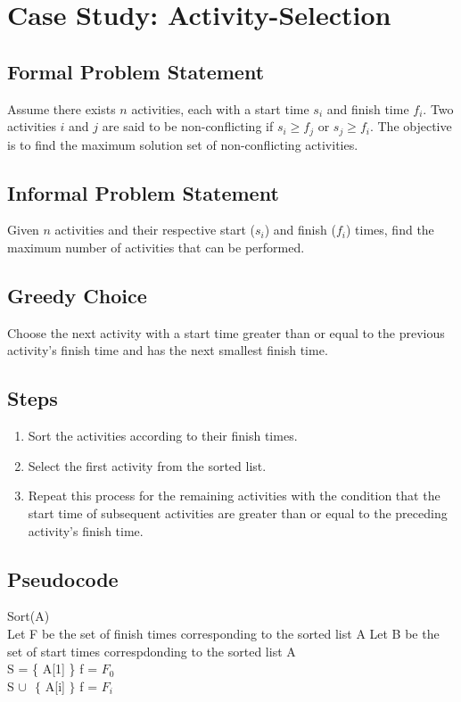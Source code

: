 \section{Case Study: Activity-Selection}

\subsection{Formal Problem Statement}
Assume there exists $n$ activities, each with a start time $s_i$ and finish time $f_i$. Two activities $i$ and $j$ are said to be non-conflicting if $s_i \geq f_j$ or $s_j \geq f_i$. The objective is to find the maximum solution set of non-conflicting activities.

\subsection{Informal Problem Statement}
Given $n$ activities and their respective start ($s_i$) and finish ($f_i$) times, find the maximum number of activities that can be performed.

\subsection{Greedy Choice}
Choose the next activity with a start time greater than or equal to the previous activity's finish time and has the next smallest finish time.

\subsection{Steps}
\begin{enumerate}
	\item Sort the activities according to their finish times. 
	\item Select the first activity from the sorted list.
	\item Repeat this process for the remaining activities with the condition that the start time of subsequent activities are greater than or equal to the preceding activity's finish time. 
\end{enumerate}

\subsection{Pseudocode}
\begin{algorithm}
\begin{algorithmic}[1]
	\State Sort(A) \\
	\State Let F be the set of finish times corresponding to the sorted list A
	\State Let B be the set of start times correspdonding to the sorted list A\\
	\State S = \{ A[1] \}
	\State f = $F_0$\\
			\State S $\cup \text{ } \{$ A[i] $\}$
			\State f = $F_i$
		\EndIf	
	\EndFor
\EndProcedure
\end{algorithmic}
\end{algorithm}